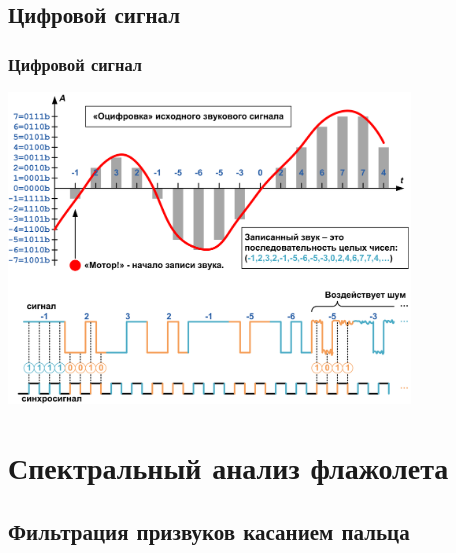 \subsection{Цифровой сигнал}

\begin{frame}
    \frametitle{Цифровой сигнал}

    \begin{center}
        \includegraphics[width=0.8\textwidth]{figs/digital}
    \end{center}
\end{frame}


\section{Спектральный анализ флажолета}


\subsection{Фильтрация призвуков касанием пальца}


